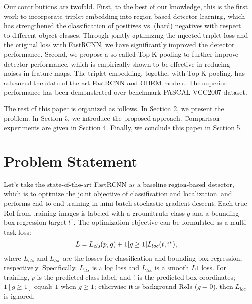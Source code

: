 \documentclass{article}
\begin{document}
{Our contributions are twofold. First, to the best of our knowledge, this is the first work to incorporate triplet embedding into region-based detector learning, which has strengthened the classification of positives vs. (hard) negatives with respect to different object classes. Through jointly optimizing the injected triplet loss and the original loss with FastRCNN, we have significantly improved the detector performance. Second, we propose a so-called Top-K pooling to further improve detector performance, which is empirically shown to be effective in reducing noises in feature maps. The triplet embedding, together with Top-K pooling, has advanced the state-of-the-art FastRCNN and OHEM models. The superior performance has been demonstrated over benchmark PASCAL VOC2007 dataset.


The rest of this paper is organized as follows. In Section 2, we present the problem. In Section 3, we introduce the proposed approach. Comparison experiments are given in Section 4. Finally, we conclude this paper in Section 5.

\section{Problem Statement}

\label{sec:format}
Let's take the state-of-the-art FastRCNN as a baseline region-based detector, which is to optimize the joint objective of classification and localization, and performs end-to-end training in mini-batch stochastic gradient descent. Each true RoI from training images is labeled with a groundtruth class $g$ and a bounding-box regression target $t^*$. The optimization objective can be formulated as a multi-task loss:
\begin{equation}
\vspace{-5pt}
\begin{array}{cl}
L =L_{cls}(p,g) + 1 [ {g} \geq 1 ] L_{loc} (t,t^*),
\end{array}
\label{eq1}
\end{equation}
where $L_{cls}$ and $L_{loc}$ are the losses for classification and bounding-box regression, respectively. Specifically, $L_{cls}$ is a log loss and $L_{loc}$ is a smooth $L1$ loss. For training, $p$ is the predicted class label, and $t$ is the predicted box coordinates; $1 [ {g} \geq 1 ]$ equals $1$ when ${g} \geq 1$; otherwise it is background RoIs ($g=0$), then $L_{loc}$ is ignored.

}
\end{document}
